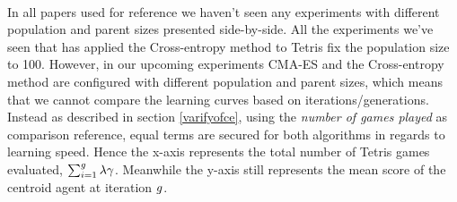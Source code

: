 \\
In all papers used for reference we haven't seen any experiments with different population
and parent sizes presented side-by-side. All the experiments we've seen
that has applied the Cross-entropy method to Tetris fix the population size to 100. 
However, in our upcoming experiments
CMA-ES and the Cross-entropy method are configured with different population and parent sizes, which means
that we cannot compare the learning curves based on iterations/generations. Instead as described
in section \ref{varifyofce}, using the  
\textit{number of games played} as comparison reference, equal terms are secured for both algorithms 
in regards to learning speed.
Hence the x-axis represents the total number 
of Tetris games evaluated, 
$\sum_{i = 1}^{g} \lambda \gamma$. 
Meanwhile the y-axis still represents the mean score 
of the centroid agent at iteration $g$.\\














